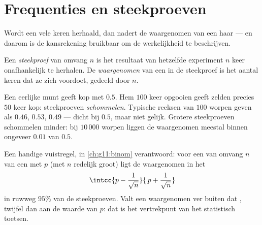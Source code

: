 \section{Frequenties en steekproeven}

Wordt een  vele keren herhaald, dan nadert de waargenomen
 van een  haar  --- en daarom is de kansrekening
bruikbaar om de werkelijkheid te beschrijven.

\begin{definition}[Steekproef]\label{def:g10:proba:sample}
Een \emph{steekproef} van omvang $n$ is het resultaat van
hetzelfde experiment $n$ keer onafhankelijk te herhalen. De \emph{waargenomen
} van een  in de steekproef is het aantal keren dat ze
zich voordoet, gedeeld door $n$.
\end{definition}

\begin{example}\label{ex:g10:proba:sampling}
Een eerlijke munt geeft kop met  $0.5$. Hem $100$ keer opgooien geeft
zelden precies $50$ keer kop: steekproeven \emph{schommelen}. Typische
reeksen van $100$ worpen geven  als $0.46$, $0.53$, $0.49$ ---
dicht bij $0.5$, maar niet gelijk. Grotere steekproeven schommelen minder:
bij $10\,000$ worpen liggen de waargenomen  meestal binnen
ongeveer $0.01$ van $0.5$.
\end{example}

\begin{remark}[Schommelingsinterval]
Een handige vuistregel, in \cref{ch:g11:binom} verantwoord: voor een
 van omvang $n$ van een  met  $p$ (met $n$ redelijk
groot) ligt de waargenomen  in het 
\[
\intcc{p - \frac{1}{\sqrt n}}{\,p + \frac{1}{\sqrt n}}
\]
in ruwweg $95\%$ van de steekproeven. Valt een waargenomen  ver
buiten dat , twijfel dan aan de waarde van $p$: dat is het
vertrekpunt van het statistisch toetsen.
\end{remark}

